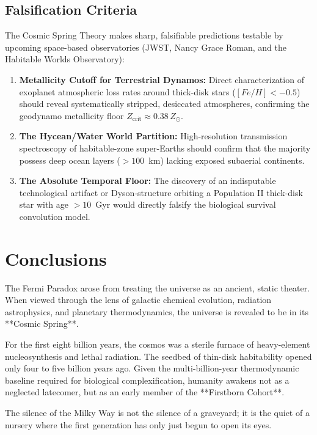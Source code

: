 \documentclass[11pt,a4paper]{article}
\begin{document}
\subsection{Falsification Criteria}

The Cosmic Spring Theory makes sharp, falsifiable predictions testable by upcoming space-based observatories (JWST, Nancy Grace Roman, and the Habitable Worlds Observatory):
\begin{enumerate}
    \item \textbf{Metallicity Cutoff for Terrestrial Dynamos:} Direct characterization of exoplanet atmospheric loss rates around thick-disk stars ($[Fe/H] < -0.5$) should reveal systematically stripped, desiccated atmospheres, confirming the geodynamo metallicity floor $Z_{\mathrm{crit}} \approx 0.38\,Z_\odot$.
    \item \textbf{The Hycean/Water World Partition:} High-resolution transmission spectroscopy of habitable-zone super-Earths should confirm that the majority possess deep ocean layers ($>100$~km) lacking exposed subaerial continents.
    \item \textbf{The Absolute Temporal Floor:} The discovery of an indisputable technological artifact or Dyson-structure orbiting a Population II thick-disk star with age $>10$~Gyr would directly falsify the biological survival convolution model.
\end{enumerate}

\section{Conclusions}
\label{sec:conclusion}

The Fermi Paradox arose from treating the universe as an ancient, static theater. When viewed through the lens of galactic chemical evolution, radiation astrophysics, and planetary thermodynamics, the universe is revealed to be in its **Cosmic Spring**. 

For the first eight billion years, the cosmos was a sterile furnace of heavy-element nucleosynthesis and lethal radiation. The seedbed of thin-disk habitability opened only four to five billion years ago. Given the multi-billion-year thermodynamic baseline required for biological complexification, humanity awakens not as a neglected latecomer, but as an early member of the **Firstborn Cohort**. 

The silence of the Milky Way is not the silence of a graveyard; it is the quiet of a nursery where the first generation has only just begun to open its eyes.
\end{document}
